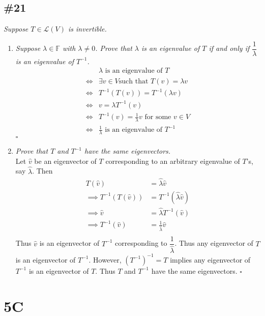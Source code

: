 \documentclass[12pt]{article}
\begin{document}
\subsection*{\#21}
{\it Suppose $T \in \mathcal{L}(V)$ is invertible.}
	\begin{enumerate}[\it\ \ (a)\ \ ]
		\item {\it Suppose $\lambda \in \mathbb{F}$ with $\lambda \neq 0$.  Prove that $\lambda$ is an eigenvalue of $T$ if and only if $\dfrac{1}{\lambda}$ is an eigenvalue of $T^{-1}$.} \\
		\begin{align*}
			&\lambda \text{ is an eigenvalue of }T \\[.1cm]
			\iff &\exists v \in V \text{such that }T(v) = \lambda v \\[.1cm]
			\iff &T^{-1}(T(v)) = T^{-1}(\lambda v) \\[.1cm]
			\iff &v = \lambda T^{-1}(v) \\[.1cm]
			\iff &T^{-1}(v) = \frac{1}{\lambda}v \text{ for some $v \in V$}\\[.1cm]
			\iff &\frac{1}{\lambda} \text{ is an eigenvalue of }T^{-1}
		\end{align*}\hfill $\square$
		\item {\it Prove that $T$ and $T^{-1}$ have the same eigenvectors.} \\
		
		\noindent Let $\hat{v}$ be an eigenvector of $T$ corresponding to an arbitrary eigenvalue of $T$'s, say $\hat{\lambda}$.  Then
		\begin{align*}
			T(\hat{v}) &= \hat{\lambda}\hat{v} \\
			\implies T^{-1}(T(\hat{v})) &= T^{-1}(\hat{\lambda}\hat{v}) \\
			\implies \hat{v} &= \hat{\lambda}T^{-1}(\hat{v}) \\
			\implies T^{-1}(\hat{v}) &= \frac{1}{\hat{\lambda}}\hat{v} \\
		\end{align*}
		Thus $\hat{v}$ is an eigenvector of $T^{-1}$ corresponding to $\dfrac{1}{\hat{\lambda}}$.  Thus any eigenvector of $T$ is an eigenvector of $T^{-1}$.  However, $(T^{-1})^{-1} = T$ implies any eigenvector of $T^{-1}$ is an eigenvector of $T$.  Thus $T$ and $T^{-1}$ have the same eigenvectors. \hfill $\square$
	\end{enumerate}
\section*{5C}
\end{document}
